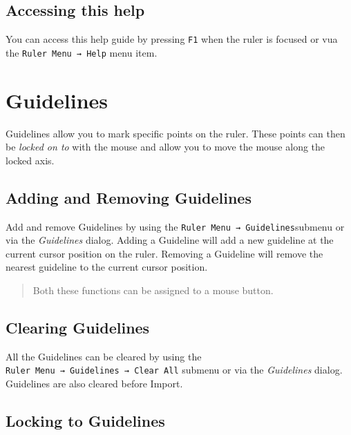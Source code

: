 \documentclass[
]{book}
\begin{document}
\hypertarget{help}{%
\section{Accessing this help}\label{help}}

You can access this help guide by pressing \texttt{F1} when the ruler is focused or vua the \texttt{Ruler\ Menu\ →\ Help} menu item.

\hypertarget{guidelines}{%
\chapter{Guidelines}\label{guidelines}}

Guidelines allow you to mark specific points on the ruler.
These points can then be \emph{locked on to} with the mouse and allow you to move the mouse along the locked axis.

\hypertarget{adding-and-removing-guidelines}{%
\section{Adding and Removing Guidelines}\label{adding-and-removing-guidelines}}

Add and remove Guidelines by using the \texttt{Ruler\ Menu\ →\ Guidelines}submenu or via the \emph{Guidelines} dialog.
Adding a Guideline will add a new guideline at the current cursor position on the ruler.
Removing a Guideline will remove the nearest guideline to the current cursor position.

\begin{quote}
Both these functions can be assigned to a mouse button.
\end{quote}

\hypertarget{clearing-guidelines}{%
\section{Clearing Guidelines}\label{clearing-guidelines}}

All the Guidelines can be cleared by using the \texttt{Ruler\ Menu\ →\ Guidelines\ →\ Clear\ All} submenu or via the \emph{Guidelines} dialog.
Guidelines are also cleared before Import.

\hypertarget{locking-to-guidelines}{%
\section{Locking to Guidelines}\label{locking-to-guidelines}}
\end{document}
